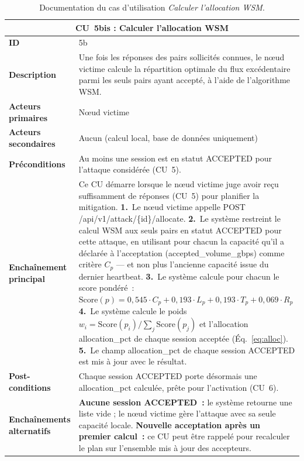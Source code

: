 \begin{table}[H]
\centering
\renewcommand{\arraystretch}{1.5}
\begin{tabular}{|p{3.5cm}|p{10.5cm}|}
\hline
\multicolumn{2}{|c|}{\textbf{CU~5bis : Calculer l'allocation WSM}} \\
\hline
\textbf{ID} & 5b \\
\hline
\textbf{Description} & Une fois les réponses des pairs sollicités connues, le nœud victime calcule la répartition optimale du flux excédentaire parmi les seuls pairs ayant accepté, à l'aide de l'algorithme WSM. \\
\hline
\textbf{Acteurs primaires} & Nœud victime \\
\hline
\textbf{Acteurs secondaires} & Aucun (calcul local, base de données uniquement) \\
\hline
\textbf{Préconditions} & Au moins une session est en statut {ACCEPTED} pour l'attaque considérée (CU~5). \\
\hline
\textbf{Enchaînement principal} &
Ce CU démarre lorsque le nœud victime juge avoir reçu suffisamment de réponses (CU~5) pour planifier la mitigation.\newline
\textbf{1.}\ Le nœud victime appelle {POST /api/v1/attack/\{id\}/allocate}.\newline
\textbf{2.}\ Le système restreint le calcul WSM aux seuls pairs en statut {ACCEPTED} pour cette attaque, en utilisant pour chacun la capacité qu'il a déclarée à l'acceptation ({accepted\_volume\_gbps}) comme critère $C_p$ — et non plus l'ancienne capacité issue du dernier heartbeat.\newline
\textbf{3.}\ Le système calcule pour chacun le score pondéré~:\newline
\quad $\text{Score}(p) = 0{,}545 \cdot C_p + 0{,}193 \cdot L_p + 0{,}193 \cdot T_p + 0{,}069 \cdot R_p$\newline
\textbf{4.}\ Le système calcule le poids $w_i = \text{Score}(p_i) / \sum_j \text{Score}(p_j)$ et l'allocation {allocation\_pct} de chaque session acceptée (Éq.~\ref{eq:alloc}).\newline
\textbf{5.}\ Le champ {allocation\_pct} de chaque session {ACCEPTED} est mis à jour avec le résultat. \\
\hline
\textbf{Post-conditions} & Chaque session {ACCEPTED} porte désormais une {allocation\_pct} calculée, prête pour l'activation (CU~6). \\
\hline
\textbf{Enchaînements alternatifs} &
\textbf{Aucune session {ACCEPTED}~:} le système retourne une liste vide ; le nœud victime gère l'attaque avec sa seule capacité locale.\newline
\textbf{Nouvelle acceptation après un premier calcul~:} ce CU peut être rappelé pour recalculer le plan sur l'ensemble mis à jour des accepteurs. \\
\hline
\end{tabular}
\caption{Documentation du cas d'utilisation \textit{Calculer l'allocation WSM}.}
\label{tab:cu5bis}
\end{table}






